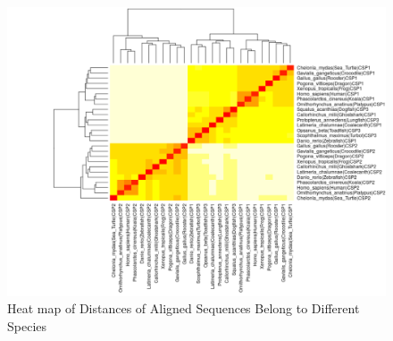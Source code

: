\documentclass[a4paper]{article}
\begin{document}
\begin{figure}[H]
\begin{center}
\includegraphics[width=.8\textwidth]{heatmap.png}
\end{center}
\caption{Heat map of Distances of Aligned Sequences Belong to Different Species}
\label{fig:heatmap}
\end{figure}

\newpage
\end{document}

